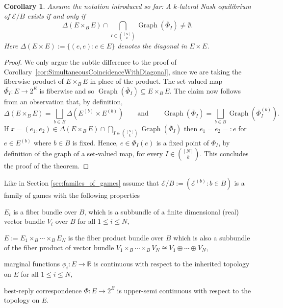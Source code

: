 \documentclass[a4paper,11pt,reqno,english]{amsart}
\theoremstyle{plain}
\newtheorem{corollary}[theorem]{Corollary}
\theoremstyle{definition}
\newcommand{\Ecal}{\mathcal{E}}
\begin{document}
\begin{corollary}\label{cor:FamilyOfGamesSimultaneousCoincidenceWithDiagonal}
	Assume the notation introduced so far: A $k$-lateral Nash equilibrium of $\mathcal{E}/B$ exists if and only if
	\begin{displaymath}
		\Delta(E\times_B E)\cap \bigcap_{I\in \binom{[N]}{k}} \operatorname{Graph}(\overline{\Phi}_I) \neq \emptyset.
	\end{displaymath}
	Here $\Delta(E\times E):=\{(e,e)\colon e\in E\}$ denotes the diagonal in $E\times E$.
\end{corollary}
\begin{proof}
	We only argue the subtle difference to the proof of Corollary~\ref{cor:SimultaneousCoincidenceWithDiagonal}, since we are taking the fiberwise product of $E\times_B E$ in place of the product.
	The set-valued map $\overline{\Phi_I}\colon E\longrightarrow 2^E$ is fiberwise and so $\operatorname{Graph}(\overline{\Phi}_I)\subseteq E\times_B E$.
	The claim now follows from an observation that, by definition,
	\[
		\Delta(E\times_B E) = \bigsqcup_{b\in B}\Delta(E^{(b)}\times E^{(b)})
		\qquad\text{and}\qquad
		\operatorname{Graph}(\overline{\Phi}_I)  = \bigsqcup_{b\in B}\operatorname{Graph}(\overline{\Phi}_I^{(b)}).
	\]
	If $x=(e_1,e_2)\in \Delta(E\times_B E)\cap \bigcap_{I\in \binom{[N]}{k}} \operatorname{Graph}(\overline{\Phi}_I)$ then $e_1=e_2=:e$ for $e\in E^{(b)}$ where $b\in B$ is fixed.
	Hence, $e\in \Phi_I(e)$ is a fixed point of $\Phi_I$, by definition of the graph of a set-valued map, for every $I\in\binom{[N]}{k}$.
	This concludes the proof of the theorem.
\end{proof}


\medskip
Like in Section \ref{sec:familes_of_games} assume that $\Ecal/B:=(\Ecal^{(b)}:b\in B)$ is a family of games with the following properties
\begin{compactitem}[\quad --]
	\item $E_i$ is a fiber bundle over $B$, which is a subbundle of a finite dimensional (real) vector bundle $V_i$ over $B$ for all $1\leq i\leq N$,
	\item $E:=E_1\times_B\cdots \times_BE_N$ is the fiber product bundle over $B$ which is also a subbundle of the fiber product of vector bundle $V_1\times_B\cdots\times_B V_N\cong V_1\oplus\cdots\oplus V_N$,
	\item marginal functions $\phi_i \colon E \longrightarrow \mathbb{R}$ is continuous with respect to the inherited topology on $E$ for all $1\leq i\leq N$,
	\item best-reply correspondence $\Phi \colon E \longrightarrow 2^{E}$ is upper-semi continuous with respect to the topology on $E$.
\end{compactitem}
\end{document}

